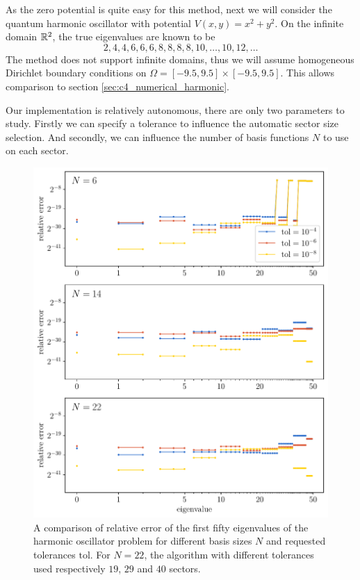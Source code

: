 As the zero potential is quite easy for this method, next we will consider the quantum harmonic oscillator with potential $V(x, y) = x^2 + y^2$. On the infinite domain $\mathbb{R}^2$, the true eigenvalues are known to be
$$
  2, 4, 4, 6, 6, 6, 8, 8, 8, 8, 10, \dots, 10, 12, \dots
$$
The method does not support infinite domains, thus we will assume homogeneous Dirichlet boundary conditions on $\Omega = [-9.5, 9.5] \times [-9.5, 9.5]$. This allows comparison to section \ref{sec:c4_numerical_harmonic}.

Our implementation is relatively autonomous, there are only two parameters to study. Firstly we can specify a tolerance to influence the automatic sector size selection. And secondly, we can influence the number of basis functions $N$ to use on each sector.

\begin{figure}
  \begin{center}
    \includegraphics[width=\textwidth]{img/chapter3/experiments/harmonic.pdf}
  \end{center}
  \caption{A comparison of relative error of the first fifty eigenvalues of the harmonic oscillator problem for different basis sizes $N$ and requested tolerances $\text{tol}$. For $N=22$, the algorithm with different tolerances used respectively $19$, $29$ and $40$ sectors.}\label{fig:c3_experiment_harmonic}
\end{figure}

